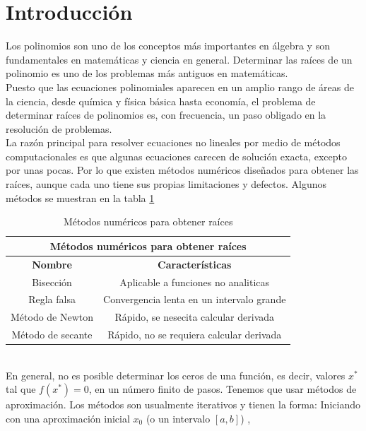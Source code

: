 \documentclass[12pt]{article}
\begin{document}
		\section*{\centering Introducción}\label{sec:Introducción}
			Los polinomios son uno de los conceptos más importantes en álgebra y son fundamentales en 
			matemáticas y ciencia en general. Determinar las raíces de un polinomio es uno de los problemas 
			más antiguos en matemáticas.\\
			Puesto que las ecuaciones polinomiales aparecen en un amplio rango de áreas de la ciencia, desde 
			química y física básica hasta economía, el problema de determinar raíces de polinomios es, con 
			frecuencia, un paso obligado en la resolución de problemas.\cite{bib:item1}\\
			La razón principal para resolver ecuaciones no lineales por medio de métodos computacionales es 
			que algunas ecuaciones carecen de solución exacta, excepto por unas pocas. Por lo que existen 
			métodos numéricos diseñados para obtener las raíces, aunque cada uno tiene sus propias 
			limitaciones y defectos. Algunos métodos se muestran en la tabla \ref{tab:1}\cite{bib:item2}\\
			\begin{table}[h!]
				\centering
				\begin{tabular}{|c|c|}
					\hline
					\multicolumn{2}{|c|}{\textbf{Métodos numéricos para obtener raíces}}\\
					\hline
					\textbf{Nombre} & \textbf{Características} \\\hline
					Bisección & Aplicable a funciones no analiticas \\\hline
					Regla falsa & Convergencia lenta en un intervalo grande \\\hline								
					Método de Newton & Rápido, se nesecita calcular derivada \\\hline
					Método de secante & Rápido, no se requiera calcular derivada \\\hline
				\end{tabular}
				\caption{Métodos numéricos para obtener raíces \cite{bib:item2}}
				\label{tab:1}
			\end{table}\\
			En general, no es posible determinar los ceros de una función, es decir, valores $ x^* $ tal que $f(x^*) = 0 $, 
			en un número finito de pasos. Tenemos que usar métodos de aproximación. Los métodos son 
			usualmente iterativos y tienen la forma: Iniciando con una aproximación inicial $ x_0 $ (o un intervalo $ [a,b] $) , 
\end{document}
